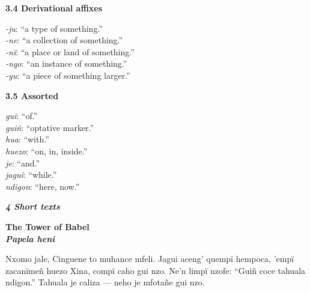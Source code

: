 \documentclass{article}[10pt]
\newcommand{\define}[2]{\emph{#1}: ``#2.'' \\}
\begin{document}
{\bf 3.4 Derivational affixes}
\begin{multicols}{3}
\noindent
\define{-ju}{a type of something}
\define{-ne}{a collection of something}
\define{-n\"{i}}{a place or land of something}
\define{-ngo}{an instance of something}
\define{-yu}{a piece of something larger}
\end{multicols}

{\bf 3.5 Assorted}
\begin{multicols}{3}
\noindent
\define{gui}{of}
\define{gui\~{n}}{optative marker}
\define{hua}{with}
\define{huezo}{on, in, inside}
\define{je}{and}
\define{jagui}{while}
\define{ndigon}{here, now}
\end{multicols}

\clearpage
{\bf \emph{4 Short texts}}\\

\begin{center}
\bf The Tower of Babel\\
\emph{Papela heni}\\
\end{center}

Nxomo jale, Cinguene to muhance mfeli. Jagui aceng' quemp\"{i} hempoca, 'emp\"{i} zacan\"{i}me\~{n} huezo Xina, comp\"{i} caho gui nzo. Ne'n limp\"{i} nzofe: ``Gui\~{n} coce tahuala ndigon.'' Tahuala je caliza --- neho je mfota\~{n}e gui nzo.
\end{document}
